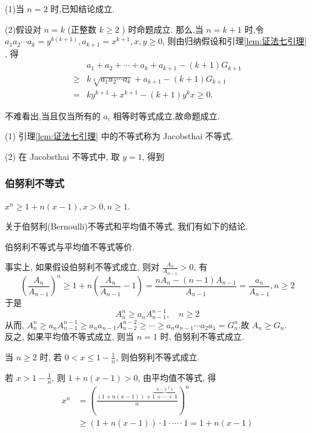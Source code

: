 (1)当 $n=2$ 时,已知结论成立.

(2)假设对 $n=k$ (正整数 $k \geqslant 2$ ) 时命题成立. 那么,当 $n=k+1$ 时,令 $a_{1} a_{2} \cdots a_{k}=y^{k(k+1)}, a_{k+1}=x^{k+1}, x, y \geqslant 0$, 则由归纳假设和引理\ref{lem:证法七引理} , 得
$$
\begin{aligned}
& a_{1}+a_{2}+\cdots+a_{k}+a_{k+1}-(k+1) G_{k+1} \\
\geqslant & k \sqrt[k]{a_{1} a_{2} \cdots a_{k}}+a_{k+1}-(k+1) G_{k+1} \\
= & k y^{k+1}+x^{k+1}-(k+1) y^{k} x \geqslant 0 .
\end{aligned}
$$

不难看出,当且仅当所有的 $a_{i}$ 相等时等式成立,故命题成立.

\begin{note}
(1) 引理\ref{lem:证法七引理} 中的不等式称为 Jacobsthai 不等式.

(2) 在 Jacobsthai 不等式中, 取 $y=1$, 得到

\subsubsection*{伯努利不等式} \quad $x^{n} \geqslant 1+n(x-1), x>0, n \geqslant 1$.
\end{note}

关于伯努利(Bernoulli)不等式和平均值不等式, 我们有如下的结论.

\begin{theorem}
  伯努利不等式与平均值不等式等价.
\end{theorem}
事实上, 如果假设伯努利不等式成立, 则对 $\frac{A_{n}}{A_{n-1}}>0$, 有
$$
\left(\frac{A_{n}}{A_{n-1}}\right)^{n} \geqslant 1+n\left(\frac{A_{n}}{A_{n-1}}-1\right)=\frac{n A_{n}-(n-1) A_{n-1}}{A_{n-1}}=\frac{a_{n}}{A_{n-1}}, n \geqslant 2
$$
于是
$$
A_{n}^{n} \geqslant a_{n} A_{n-1}^{n-1}, \quad n \geqslant 2
$$
从而, $A_{n}^{n} \geqslant a_{n} A_{n-1}^{n-1} \geqslant a_{n} a_{n-1} A_{n-2}^{n-2} \geqslant \cdots \geqslant a_{n} a_{n-1} \cdots a_{2} a_{1}=G_{n}^{n}$.故 $A_{n} \geqslant G_{n}$.\\

反之, 如果平均值不等式成立, 则当 $n=1$ 时, 伯努利不等式成立.

当 $n \geqslant 2$ 时, 若 $0<x \leqslant 1-\frac{1}{n}$, 则伯努利不等式成立.

若 $x>1-\frac{1}{n}$, 则 $1+n(x-1)>0$, 由平均值不等式, 得
$$
\begin{aligned}
x^{n} & =(\frac{(1+n(x-1))+\overbrace{1+\cdots+1}^{n-1 \uparrow 1}}{n})^{n} \\
& \geqslant(1+n(x-1)) \cdot 1 \cdot \cdots \cdot 1=1+n(x-1)
\end{aligned}
$$

